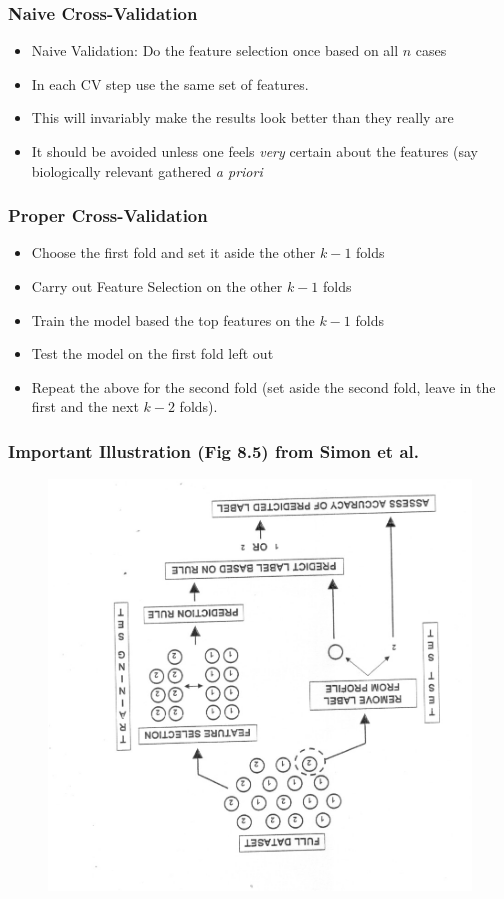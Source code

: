 \documentclass[xcolor=x11names,compress]{beamer}\usepackage[]{graphicx}\usepackage[]{color}
\begin{document}
\begin{frame}
  \frametitle{Naive Cross-Validation}
  \begin{itemize}
\item  Naive Validation: Do the feature selection once based on all $n$ cases
\item In each CV step use the same set of features.
\item This will invariably make the results look better than
      they really are
\item It should be avoided unless one feels {\it very} certain about the features
      (say biologically relevant gathered      {\it a priori}
\end{itemize}

\end{frame}
\begin{frame}
  \frametitle{Proper Cross-Validation}
  \begin{itemize}
\item Choose the first fold and set it aside the other $k-1$ folds
\item Carry out Feature Selection on the other $k-1$ folds
\item Train the model based the top features on the $k-1$ folds
\item Test the model on the first fold left out
\item Repeat the above for the second fold (set aside the second fold,
 leave in the first and the
next $k-2$ folds).
\end{itemize}
\end{frame}

\begin{frame}
  \frametitle{Important Illustration (Fig 8.5) from Simon et al.}
  \begin{figure}
    \centering
    \includegraphics[scale=0.45,angle=178]{Figures/simon-cv.png}
  \end{figure}
\end{frame}
\end{document}
